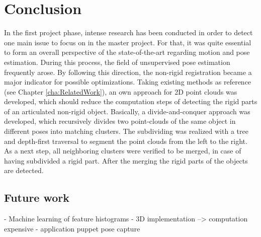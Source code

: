 \chapter{Conclusion}
\label{cha:Closing}

In the first project phase, intense research has been conducted in order to detect one main issue to focus on in the master project. For that, it was quite essential to form an overall perspective of the state-of-the-art regarding motion and pose estimation. During this process, the field of unsupervised pose estimation frequently arose. By following this direction, the non-rigid registration became a major indicator for possible optimizations. Taking existing methods as reference (see Chapter \ref{cha:RelatedWork}), an own approach for 2D point clouds was developed, which should reduce the computation steps of detecting the rigid parts of an articulated non-rigid object. Basically, a divide-and-conquer approach was developed, which recursively divides two point-clouds of the same object in different poses into matching clusters. The subdividing was realized with a tree and depth-first traversal to segment the point clouds from the left to the right. As a next step, all neighboring clusters were verified to be merged, in case of having subdivided a rigid part. After the merging the rigid parts of the objects are detected. 








	
\section{Future work}

- Machine learning of feature histograms
- 3D implementation --> computation expensive
- application puppet pose capture

